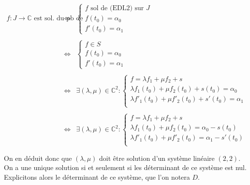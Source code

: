 \documentclass{article}
\begin{document}
\begin{question_kholle}
 	$$\begin{array}{ccl}
 		f : J \to \mathbb{C} \text{ est sol. du pb de Cauchy }
 		& \iff & \left\{ \begin{array}{l}
 			f \text{ sol de (EDL2) sur } J \\
 			f(t_{0}) = \alpha_{0}          \\
 			f'(t_{0}) = \alpha_{1}
 		\end{array}  \right.                                                                                \\\\
 		& \iff & \left\{ \begin{array}{l}
 			f \in S               \\
 			f(t_{0}) = \alpha_{0} \\
 			f'(t_{0}) = \alpha_{1}
 		\end{array}\right.                                                                                         \\\\
 		& \iff & \exists (\lambda, \mu) \in \mathbb{C}^{2}: \left\{ \begin{array}{l}
 			f = \lambda f_{1} + \mu f_{2} + s                                  \\
 			\lambda f_{1}(t_{0}) + \mu f_{2}(t_{0}) + s(t_{0}) = \alpha_{0}    \\
 			\lambda f'_{1}(t_{0}) + \mu f'_{2}(t_{0}) + s'(t_{0}) = \alpha_{1} \\
 		\end{array} \right. \\\\
 		& \iff & \exists (\lambda, \mu) \in \mathbb{C}^{2}: \left\{ \begin{array}{l}
 			f = \lambda f_{1} + \mu f_{2} + s                                  \\
 			\lambda f_{1}(t_{0}) + \mu f_{2}(t_{0}) = \alpha_{0} - s(t_{0})    \\
 			\lambda f'_{1}(t_{0}) + \mu f'_{2}(t_{0}) = \alpha_{1} - s'(t_{0}) \\
 		\end{array} \right. \\\\
 	\end{array} $$
 	On en déduit donc que $(\lambda, \mu)$ doit être solution d'un système linéaire $(2,2)$. On a une unique solution si et seulement si les déterminant de ce système est nul. \\
 	Explicitons alors le déterminant de ce système, que l'on notera $D$.

\end{question_kholle}
\end{document}
